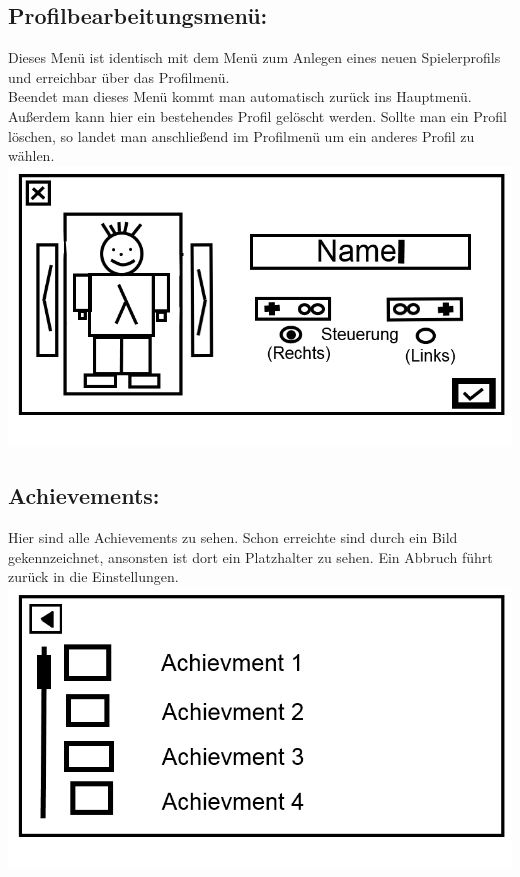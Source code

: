 \documentclass{scrartcl}
\begin{document}
\begin{enumerate}
	\begin{minipage}{1\textwidth}
		\item \subsection*{Profilbearbeitungsmenü:}
		Dieses Menü ist identisch mit dem Menü zum Anlegen eines neuen Spielerprofils und erreichbar über das Profilmenü.\\
		Beendet man dieses Menü kommt man automatisch zurück ins Hauptmenü.\\
		Außerdem kann hier ein bestehendes Profil gelöscht werden. Sollte man ein Profil löschen, so landet man anschließend im Profilmenü um ein anderes Profil zu wählen.
		\includegraphics[scale=0.5]{assets/CreateProfile2}
	\end{minipage}

	\begin{minipage}{1\textwidth}
		\item \subsection*{Achievements:}
		Hier sind alle Achievements zu sehen. Schon erreichte sind durch ein Bild gekennzeichnet, ansonsten ist dort ein Platzhalter zu sehen. Ein Abbruch führt zurück in die Einstellungen.\\
		\includegraphics[scale=0.5]{assets/Achievments}
		

\end{minipage}
\end{enumerate}
\end{document}
